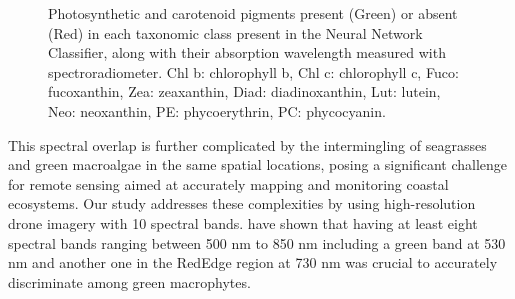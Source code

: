 \documentclass[
  number]{elsarticle}
\begin{document}
\label{cell-fig-Pigm}
\begin{figure}[H]


\caption{\label{fig-Pigm}Photosynthetic and carotenoid pigments present
(Green) or absent (Red) in each taxonomic class present in the Neural
Network Classifier, along with their absorption wavelength measured with
spectroradiometer. Chl b: chlorophyll b, Chl c: chlorophyll c, Fuco:
fucoxanthin, Zea: zeaxanthin, Diad: diadinoxanthin, Lut: lutein, Neo:
neoxanthin, PE: phycoerythrin, PC: phycocyanin.}

\end{figure}%

This spectral overlap is further complicated by the intermingling of
seagrasses and green macroalgae in the same spatial locations, posing a
significant challenge for remote sensing aimed at accurately mapping and
monitoring coastal ecosystems. Our study addresses these complexities by
using high-resolution drone imagery with 10 spectral bands.
\citep{Davies2023} have shown that having at least eight spectral bands
ranging between 500 nm to 850 nm including a green band at 530 nm and
another one in the RedEdge region at 730 nm was crucial to accurately
discriminate among green macrophytes.
\end{document}
